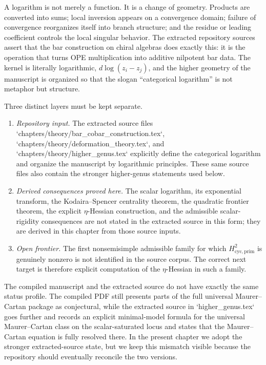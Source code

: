 A logarithm is not merely a function.  It is a change of geometry.  Products are
converted into sums; local inversion appears on a convergence domain; failure of
convergence reorganizes itself into branch structure; and the residue or leading
coefficient controls the local singular behavior.  The extracted repository
sources assert that the bar construction on chiral algebras does exactly this:
it is the operation that turns OPE multiplication into additive nilpotent bar
data.  The kernel is literally logarithmic, $d\log(z_i-z_j)$, and the higher
geometry of the manuscript is organized so that the slogan ``categorical
logarithm'' is not metaphor but structure.

\begin{context}
\label{ctx:source-state-taxonomy}
Three distinct layers must be kept separate.
\begin{enumerate}[label=\textup{(\alph*)}]
\item \emph{Repository input.}  The extracted source files
`chapters/theory/bar\_cobar\_construction.tex`,
`chapters/theory/deformation\_theory.tex`, and
`chapters/theory/higher\_genus.tex` explicitly define the categorical
logarithm and organize the manuscript by logarithmic principles.  These same
source files also contain the stronger higher-genus statements used below.
\item \emph{Derived consequences proved here.}  The scalar logarithm,
its exponential transform, the Kodaira--Spencer centrality theorem, the
quadratic frontier theorem, the explicit $\eta$-Hessian construction, and the
admissible scalar-rigidity consequences are not stated in the extracted source
in this form; they are derived in this chapter from those source inputs.
\item \emph{Open frontier.}  The first nonsemisimple admissible family for which
$H^2_{\mathrm{cyc,prim}}$ is genuinely nonzero is not identified in the source
corpus.  The correct next target is therefore explicit computation of the
$\eta$-Hessian in such a family.
\end{enumerate}
\end{context}

\begin{remark}
\label{rem:source-mismatch}
The compiled manuscript and the extracted source do not have exactly the same
status profile.  The compiled PDF still presents parts of the full universal
Maurer--Cartan package as conjectural, while the extracted source in
`higher\_genus.tex` goes further and records an explicit minimal-model formula
for the universal Maurer--Cartan class on the scalar-saturated locus and states
that the Maurer--Cartan equation is fully resolved there.  In the present
chapter we adopt the stronger extracted-source state, but we keep this mismatch
visible because the repository should eventually reconcile the two versions.
\end{remark}

